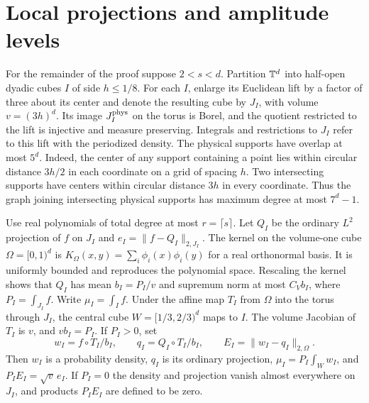 \section{Local projections and amplitude levels}\label{sec:geometry}

For the remainder of the proof suppose \(2<s<d\).
Partition \(\mathbb T^d\) into half-open dyadic cubes \(I\) of side
\(h\le1/8\). For each \(I\), enlarge its Euclidean lift by a
factor of three about its center and denote the resulting cube
by \(J_I\), with volume \(v=(3h)^d\). Its image \(J_I^{\rm phys}\)
on the torus is Borel, and the quotient restricted to the lift
is injective and measure preserving. Integrals and restrictions
to \(J_I\) refer to this lift with the periodized density. The
physical supports have overlap at most \(5^d\). Indeed, the center
of any support containing a point lies within circular distance
\(3h/2\) in each coordinate on a grid of spacing \(h\). Two
intersecting supports have centers within circular distance \(3h\)
in every coordinate. Thus the graph joining intersecting physical
supports has maximum degree at most \(7^d-1\).

Use real polynomials of total degree at most \(r=\lceil s\rceil\).
Let \(Q_I\) be the ordinary \(L^2\) projection of \(f\) on \(J_I\)
and \(e_I=\|f-Q_I\|_{2,J_I}\). The kernel on the volume-one cube
\(\Omega=[0,1)^d\) is \(K_\Omega(x,y)=\sum_i\phi_i(x)\phi_i(y)\)
for a real orthonormal basis. It is uniformly bounded and
reproduces the polynomial space. Rescaling the kernel shows that
\(Q_I\) has mean \(b_I=P_I/v\) and supremum norm at most \(C_V b_I\),
where \(P_I=\int_{J_I} f\). Write \(\mu_I=\int_I f\).
Under the affine map \(T_I\) from \(\Omega\) into the torus
through \(J_I\), the central cube \(W=[1/3,2/3)^d\)
maps to \(I\). The volume Jacobian of \(T_I\) is \(v\),
and \(vb_I=P_I\). If \(P_I>0\), set
\[
 w_I=f\circ T_I/b_I,\qquad q_I=Q_I\circ T_I/b_I,\qquad
 E_I=\|w_I-q_I\|_{2,\Omega}.
\]
Then \(w_I\) is a probability density, \(q_I\) is its ordinary
projection, \(\mu_I=P_I\int_W w_I\), and \(P_I E_I=\sqrt v\,e_I\).
If \(P_I=0\) the density and projection vanish almost everywhere on
\(J_I\), and products \(P_I E_I\) are defined to be zero.

